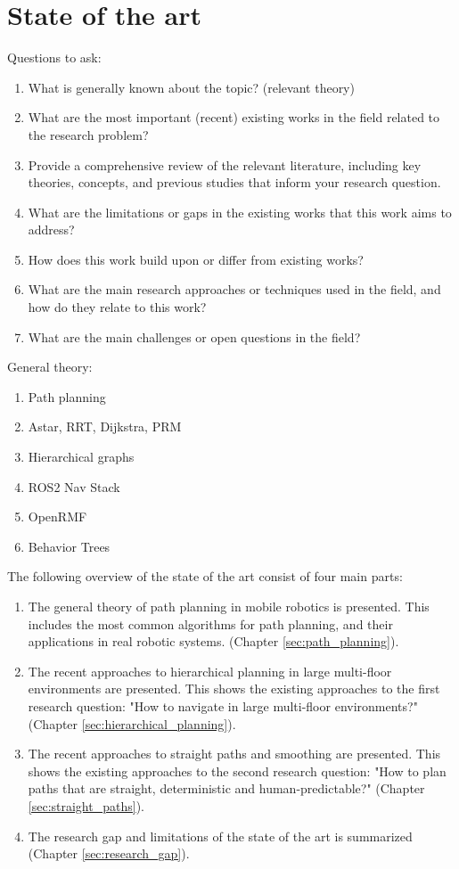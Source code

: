 \chapter{State of the art}
\label{sec:state_of_the_art}
Questions to ask:
\begin{enumerate}
    \item What is generally known about the topic? (relevant theory)
    \item What are the most important (recent) existing works in the field related to the research problem? 
    \item Provide a comprehensive review of the relevant literature, including key theories, concepts, and previous studies that inform your research question.
    \item What are the limitations or gaps in the existing works that this work aims to address? 
    \item How does this work build upon or differ from existing works? 
    \item What are the main research approaches or techniques used in the field, and how do they relate to this work? 
    \item What are the main challenges or open questions in the field? 
\end{enumerate}

General theory:
\begin{enumerate}
    \item Path planning
    \item Astar, RRT, Dijkstra, PRM
    \item Hierarchical graphs
    \item ROS2 Nav Stack
    \item OpenRMF
    \item Behavior Trees
\end{enumerate}

The following overview of the state of the art consist of four main parts:
\begin{enumerate}
    \item The general theory of path planning in mobile robotics is presented. This includes the most common algorithms for path planning, and their applications in real robotic systems. (Chapter \ref{sec:path_planning}).
    \item The recent approaches to hierarchical planning in large multi-floor environments are presented. This shows the existing approaches to the first research question: "How to navigate in large multi-floor environments?" (Chapter \ref{sec:hierarchical_planning}).
    \item The recent approaches to straight paths and smoothing are presented. This shows the existing approaches to the second research question: "How to plan paths that are straight, deterministic and human-predictable?" (Chapter \ref{sec:straight_paths}).
    \item The research gap and limitations of the state of the art is summarized (Chapter \ref{sec:research_gap}).
\end{enumerate}

